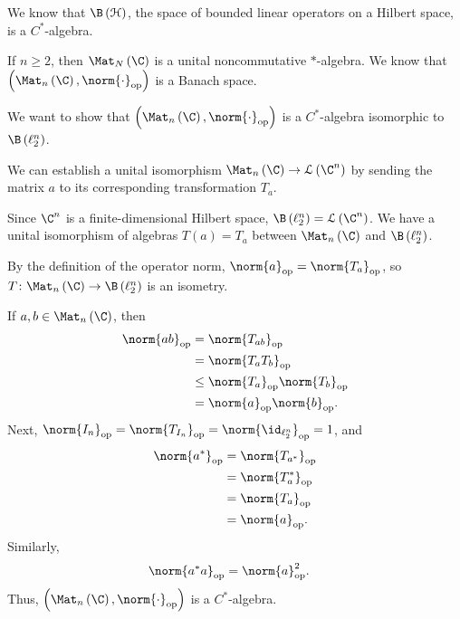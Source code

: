 \documentclass[10pt]{mypackage}
\begin{document}
\begin{example}
  We know that $\B\left(\mathcal{H}\right)$, the space of bounded linear operators on a Hilbert space, is a $C^{\ast}$-algebra.
\end{example}
\begin{example}
  If $n\geq 2$, then $\Mat_N\left(\C\right)$ is a unital noncommutative $\ast$-algebra. We know that $\left(\Mat_n\left(\C\right),\norm{\cdot}_{\text{op}}\right)$ is a Banach space.\newline

  We want to show that $\left(\Mat_n\left(\C\right),\norm{\cdot}_{\text{op}}\right)$ is a $C^{\ast}$-algebra isomorphic to $\B\left(\ell_2^{n}\right)$.\newline

  We can establish a unital isomorphism $\Mat_n\left(\C\right)\rightarrow \mathcal{L}\left(\C^n\right)$ by sending the matrix $a$ to its corresponding transformation $T_a$.\newline

  Since $\C^n$ is a finite-dimensional Hilbert space, $\B\left(\ell_2^n\right) = \mathcal{L}\left(\C^n\right)$. We have a unital isomorphism of algebras $T\left(a\right) = T_a$ between $\Mat_n\left(\C\right)$ and $\B\left(\ell_2^n\right)$.\newline

  By the definition of the operator norm, $\norm{a}_{\text{op}} = \norm{T_a}_{\text{op}}$, so $T\colon \Mat_n\left(\C\right)\rightarrow \B\left(\ell_2^n\right)$ is an isometry.\newline

  If $a,b\in \Mat_n\left(\C\right)$, then
  \begin{align*}
    \norm{ab}_{\text{op}} &= \norm{T_{ab}}_{\text{op}}\\
                          &= \norm{T_aT_b}_{\text{op}}\\
                          &\leq \norm{T_a}_{\text{op}}\norm{T_b}_{\text{op}}\\
                          &= \norm{a}_{\text{op}}\norm{b}_{\text{op}}.
  \end{align*}
  Next, $\norm{I_n}_{\text{op}}=\norm{T_{I_n}}_{\text{op}} = \norm{\id_{\ell_2^n}}_{\text{op}} = 1$, and
  \begin{align*}
    \norm{a^{\ast}}_{\text{op}} &= \norm{T_{a^{\ast}}}_{\text{op}}\\
                                &= \norm{T_{a}^{\ast}}_{\text{op}}\\
                                &= \norm{T_a}_{\text{op}}\\
                                &= \norm{a}_{\text{op}}.
  \end{align*}
  Similarly,
  \begin{align*}
    \norm{a^{\ast}a}_{\text{op}} &= \norm{a}_{\text{op}}^2.
  \end{align*}
  Thus, $\left(\Mat_n\left(\C\right),\norm{\cdot}_{\text{op}}\right)$ is a $C^{\ast}$-algebra.
\end{example}
\end{document}
